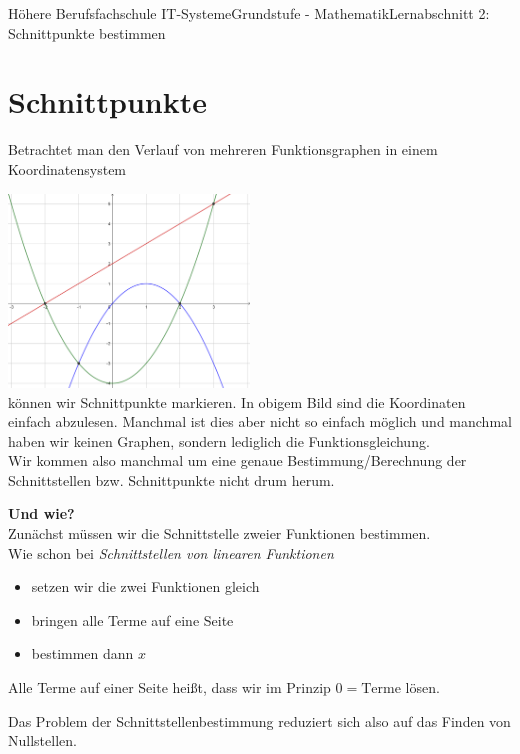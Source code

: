 \documentclass[11pt,twocolumn,oneside,openany,headings=optiontotoc,11pt,numbers=noenddot]{article}
\begin{document}
	\begin{worksheet}{Höhere Berufsfachschule IT-Systeme}{Grundstufe - Mathematik}{Lernabschnitt 2: Schnittpunkte bestimmen}
		\setcounter{section}{4}
		\section{Schnittpunkte}
		Betrachtet man den Verlauf von mehreren Funktionsgraphen in einem Koordinatensystem\\
		\par\noindent
		\includegraphics[width=0.48\textwidth]{../99_Bilder/024_NST.png}\\
		können wir Schnittpunkte markieren. In obigem Bild sind die Koordinaten einfach abzulesen. Manchmal ist dies aber nicht so einfach möglich und manchmal haben wir keinen Graphen, sondern lediglich die Funktionsgleichung.\\
		Wir kommen also manchmal um eine genaue Bestimmung/Berechnung der Schnittstellen bzw. Schnittpunkte nicht drum herum.\\
		\par\noindent
		\textbf{Und wie?}\\
		Zunächst müssen wir die Schnittstelle zweier Funktionen bestimmen.\\
		Wie schon bei \textit{Schnittstellen von linearen Funktionen}
		\begin{itemize}
			\item setzen wir die zwei Funktionen gleich
			\item bringen alle Terme auf eine Seite
			\item bestimmen dann \(x\)
		\end{itemize}
		Alle Terme auf einer Seite heißt, dass wir im Prinzip \(0 = \text{Terme}\) lösen.\\
		\par\noindent
		Das Problem der Schnittstellenbestimmung reduziert sich also auf das Finden von Nullstellen.\\
		\par\noindent

\end{worksheet}
\end{document}
